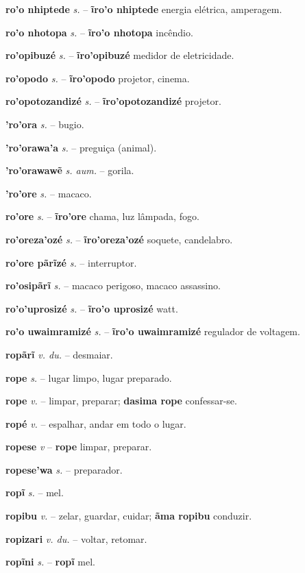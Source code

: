 \textbf{ro'o nhiptede} \textit{s.} -- \textbf{ĩro'o nhiptede} energia elétrica, amperagem.

\textbf{ro'o nhotopa} \textit{s.} -- \textbf{ĩro'o nhotopa} incêndio.

\textbf{ro'opibuzé} \textit{s.} -- \textbf{ĩro'opibuzé} medidor de eletricidade.

\textbf{ro'opodo} \textit{s.} -- \textbf{ĩro'opodo} projetor, cinema.

\textbf{ro'opotozandizé} \textit{s.} -- \textbf{ĩro'opotozandizé} projetor.

\textbf{'ro'ora} \textit{s.} -- bugio.

\textbf{'ro'orawa'a} \textit{s.} -- preguiça (animal).

\textbf{'ro'orawawẽ} \textit{s. aum.} -- gorila.

\textbf{'ro'ore} \textit{s.} -- macaco.

\textbf{ro'ore} \textit{s.} -- \textbf{ĩro'ore} chama, luz lâmpada, fogo.

\textbf{ro'oreza'ozé} \textit{s.} -- \textbf{ĩro'oreza'ozé} soquete, candelabro.

\textbf{ro'ore pãrĩzé} \textit{s.} -- interruptor.

\textbf{ro'osipãrĩ} \textit{s.} -- macaco perigoso, macaco assassino.

\textbf{ro'o'uprosizé} \textit{s.} -- \textbf{ĩro'o uprosizé} watt.

\textbf{ro'o uwaimramizé} \textit{s.} -- \textbf{ĩro'o uwaimramizé} regulador de voltagem.

\textbf{ropãrĩ} \textit{v. du.} -- desmaiar.

\textbf{rope} \textit{s.} -- lugar limpo, lugar preparado.

\textbf{rope} \textit{v.} -- limpar, preparar; \textbf{dasima rope} confessar-se.

\textbf{ropé} \textit{v.} -- espalhar, andar em todo o lugar.

\textbf{ropese} \textit{v} -- \textbf{rope} limpar, preparar.

\textbf{ropese'wa} \textit{s.} -- preparador.

\textbf{ropĩ} \textit{s.} -- mel.

\textbf{ropibu} \textit{v.} -- zelar, guardar, cuidar; \textbf{ãma ropibu} conduzir.

\textbf{ropizari} \textit{v. du.} -- voltar, retomar.

\textbf{ropĩni} \textit{s.} -- \textbf{ropĩ} mel.

